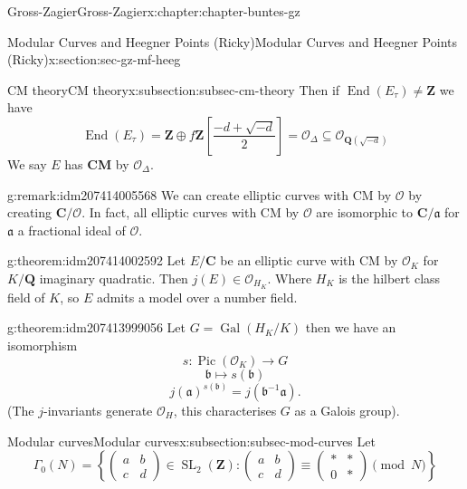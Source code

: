 \documentclass[oneside,10pt,]{book}
\newcommand{\terminology}[1]{\textbf{#1}}
\numberwithin{equation}{section}
\newcommand{\ideal}[1]{\mathfrak{#1}}
\newcommand{\inv}{^{-1}}
\newcommand{\lb}{[}
\newcommand{\rb}{]}
\newcommand{\ZZ}{\mathbf{Z}}
\newcommand{\QQ}{\mathbf{Q}}
\newcommand{\CC}{\mathbf{C}}
\newcommand{\ints}{\mathcal{O}}
\DeclareMathOperator{\End}{End}
\DeclareMathOperator{\Pic}{Pic}
\newcommand{\Gal}[2]{\operatorname{Gal}(#1/#2)}
\DeclareMathOperator{\SL}{SL}
\newcommand{\amp}{&}
\begin{document}
\begin{chapterptx}{Gross-Zagier}{}{Gross-Zagier}{}{}{x:chapter:chapter-buntes-gz}
\begin{sectionptx}{Modular Curves and Heegner Points (Ricky)}{}{Modular Curves and Heegner Points (Ricky)}{}{}{x:section:sec-gz-mf-heeg}
\begin{subsectionptx}{CM theory}{}{CM theory}{}{}{x:subsection:subsec-cm-theory}
Then if \(\End(E_\tau ) \ne \ZZ\) we have%
\begin{equation*}
\End(E_\tau ) = \ZZ \oplus f \ZZ \left\lb \frac {-d + \sqrt{-d}}{2} \right \rb = \ints_\Delta  \subseteq \ints_{\QQ(\sqrt{-d})}
\end{equation*}
We say \(E\) has \terminology{CM} by \(\ints_\Delta \).%
\begin{remark}{}{g:remark:idm207414005568}%
We can create elliptic curves with CM by \(\ints\) by creating \(\CC/\ints\). In fact, all elliptic curves with  CM by \(\ints\) are isomorphic to \(\CC/\ideal a\) for \(\ideal a\) a fractional ideal of \(\ints\).%
\end{remark}
\begin{theorem}{}{}{g:theorem:idm207414002592}%
Let \(E/\CC\) be an elliptic curve with CM by \(\ints_K\) for \(K/\QQ\) imaginary quadratic. Then \(j(E) \in \ints_{H_K}\). Where \(H_K\) is the hilbert class field of \(K\), so \(E\) admits a model over a number field.%
\end{theorem}
\begin{theorem}{}{}{g:theorem:idm207413999056}%
Let \(G = \Gal{H_K}{K}\) then we have an isomorphism%
\begin{equation*}
s\colon  \Pic(\ints_K) \to G
\end{equation*}
%
\begin{equation*}
\ideal b\mapsto s(\ideal b)
\end{equation*}
%
\begin{equation*}
j(\ideal a)^{s(\ideal b)} = j(\ideal b \inv \ideal a)\text{.}
\end{equation*}
(The \(j\)-invariants generate \(\ints_H\), this characterises \(G\) as a Galois group).%
\end{theorem}
\end{subsectionptx}
%
%
\typeout{************************************************}
\typeout{************************************************}
%
\begin{subsectionptx}{Modular curves}{}{Modular curves}{}{}{x:subsection:subsec-mod-curves}
Let%
\begin{equation*}
\Gamma_0 (N) = \left\{\begin{pmatrix} a \amp b \\ c \amp d \end{pmatrix}\in \SL_2(\ZZ) : \begin{pmatrix} a \amp b \\ c \amp d \end{pmatrix} \equiv \begin{pmatrix} \ast \amp \ast \\ 0 \amp \ast \end{pmatrix} \pmod N\right\}

\end{equation*}
\end{subsectionptx}
\end{sectionptx}
\end{chapterptx}
\end{document}
